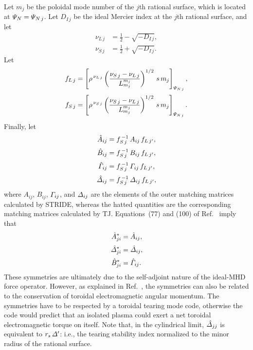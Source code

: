 \documentclass[12pt,prb,aps,notitlepage]{revtex4-1}
\begin{document}
Let $m_j$ be the poloidal mode number of the $j$th rational surface, which is located at ${\mit\Psi}_N= {\mit\Psi}_{N\,j}$. Let $D_{I\,j}$ be the ideal
Mercier index at the $j$th rational surface, and
let
\begin{align}
\nu_{L\,j} &=\frac{1}{2}-\sqrt{-D_{I\,j}},\\[0.5ex]
\nu_{S\,j} &=\frac{1}{2}+\sqrt{-D_{I\,j}}.
\end{align}
Let
\begin{align}
f_{L\,j} &= \left[\rho^{\,\nu_{L\,j}}
\left(\frac{\nu_{S\,j}-\nu_{L\,j}}{L_{m_j}^{m_j}}\right)^{1/2}\,s\,m_j
\right]_{{\mit\Psi}_{N\,j}},\\[0.5ex]
f_{S\,j} &= \left[\rho^{\,\nu_{S\,j}}
\left(\frac{\nu_{S\,j}-\nu_{L\,j}}{L_{m_j}^{m_j}}\right)^{1/2}\,s\,m_j
\right]_{{\mit\Psi}_{N\,j}}.
\end{align}
Finally, let
\begin{align}
\hat{A}_{ij}&= f_{S\,j}^{\,-1}\,A_{ij}\,f_{L\,j'},\\[0.5ex]
\hat{B}_{ij}&= f_{S\,j}^{\,-1}\,B_{ij}\,f_{L\,j'},\\[0.5ex]
\hat{\mit\Gamma}_{ij}&= f_{S\,j}^{\,-1}\,{\mit\Gamma}_{ij}\,f_{L\,j'},\\[0.5ex]
\hat{\mit\Delta}_{ij}&= f_{S\,j}^{\,-1}\,{\mit\Delta}_{ij}\,f_{L\,j'},
\end{align}
where $A_{ij}$, $B_{ij}$, ${\mit\Gamma}_{ij}$, and ${\mit\Delta}_{ij}$ are the elements of the outer matching matrices
calculated by STRIDE, whereas the hatted quantities are the  corresponding matching matrices calculated by TJ. 
Equations~(77) and (100) of Ref.~ imply that
\begin{align}
\hat{A}_{ji}^\ast &= \hat{A}_{ij},\\[0.5ex]
\hat{\mit\Delta}_{ji}^\ast &= \hat{\mit\Delta}_{ij},\label{sym}\\[0.5ex]
\hat{B}_{ji}^\ast &= \hat{\mit\Gamma}_{ij}.
\end{align}
These symmetries are ultimately due to the self-adjoint nature of the ideal-MHD force operator. However, as explained
in Ref.~, the symmetries can also be related to the conservation of toroidal electromagnetic angular momentum. The
symmetries have to be respected by a toroidal tearing mode code, otherwise the code would predict that an isolated 
plasma could exert a net toroidal electromagnetic torque on itself. Note that, in the cylindrical limit, $\hat{\mit\Delta}_{jj}$ is equivalent to $r_s\,{\mit\Delta}'$: i.e.,
the tearing stability index normalized to the minor radius of the rational surface. 
\end{document}
